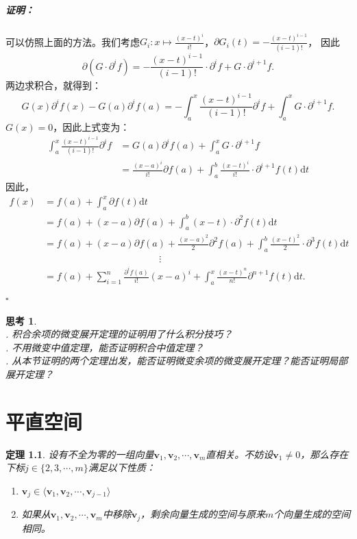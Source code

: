 \documentclass[12pt,UTF8]{ctexbook}
\renewenvironment{proof}{\paragraph{\textbf{证明：}}}{\hfill$\square$}
\newtheorem{tm}{定理}[section]
\newtheorem{sk}{思考}[section]
\begin{document}
\begin{appendix}
\begin{proof}
    可以仿照上面的方法。我们考虑$G_i: x\mapsto \frac{(x - t)^i}{i!}$，$\partial G_i(t) = -\frac{(x - t)^{i-1}}{(i-1)!}$，
    因此
    $$ \partial (G\cdot \partial^i f) = -\frac{(x - t)^{i-1}}{(i-1)!} \cdot \partial^i f + G \cdot \partial^{i+1} f. $$
    两边求积合，就得到：
    $$ G(x) \partial^i f(x) - G(a) \partial^i f(a) = - \int_a^x \frac{(x - t)^{i-1}}{(i-1)!} \partial^i f + \int_a^x G \cdot \partial^{i+1} f. $$
    $G(x) = 0$，因此上式变为：
    \begin{align*}
        \int_a^x \frac{(x - t)^{i-1}}{(i-1)!}\partial^i f & = G(a) \partial^i f(a)  + \int_a^x G \cdot \partial^{i+1} f \\
        & = \frac{(x - a)^i}{i!} \partial f(a) + \int_a^b \frac{(x - t)^i}{i!}\cdot \partial^{i+1} f(t)\mathrm{d}t
    \end{align*}
    因此，
    \begin{align*}
        f(x) &= f(a) + \int_a^x \partial f(t) \mathrm{d}t \\
        &= f(a) + (x - a) \partial f(a) + \int_a^b (x - t) \cdot \partial^2 f(t) \mathrm{d}t \\
        &= f(a) + (x - a) \partial f(a) + \frac{(x - a)^2}{2} \partial^2 f(a) + \int_a^b \frac{(x - t)^2}{2} \cdot \partial^3 f(t) \mathrm{d}t\\
        & \qquad \qquad \qquad \qquad\qquad \qquad \vdots \\
        &= f(a) + \sum_{i=1}^n \frac{\partial^i f(a)}{i!} (x - a)^i + \int_a^x \frac{(x - t)^{n}}{n!} \partial^{n+1} f(t)\mathrm{d}t. \\
    \end{align*}    
\end{proof}

\begin{sk}
    \mbox{} \\
    . 积合余项的微变展开定理的证明用了什么积分技巧？\\
    . 不用微变中值定理，能否证明积合中值定理？\\
    . 从本节证明的两个定理出发，能否证明微变余项的微变展开定理？能否证明局部展开定理？
\end{sk}

\chapter{平直空间}

\begin{tm}\label{tm:d-1-20}
    设有不全为零的一组向量$\mathbf{v}_1, \mathbf{v}_2 , \cdots , \mathbf{v}_m$直相关。不妨设$\mathbf{v}_1 \neq 0$，那么存在下标$j \in \{2,3, \cdots, m\}$满足以下性质：
    \begin{enumerate}
    \item $\mathbf{v}_j \in \langle \mathbf{v}_1, \mathbf{v}_2 , \cdots , \mathbf{v}_{j-1}\rangle$
    \item 如果从$\mathbf{v}_1, \mathbf{v}_2 , \cdots , \mathbf{v}_m$中移除$\mathbf{v}_j$，剩余向量生成的空间与原来$m$个向量生成的空间相同。
    \end{enumerate}
\end{tm}


\end{appendix}
\end{document}
